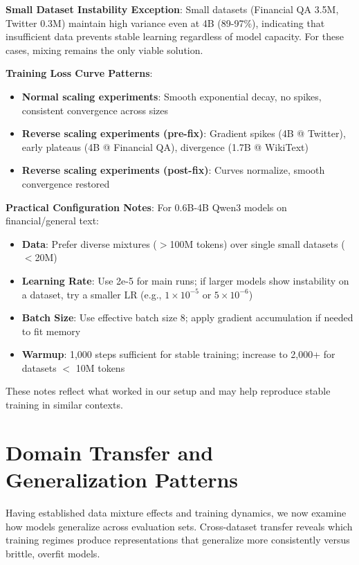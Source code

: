 \textbf{Small Dataset Instability Exception}: Small datasets (Financial QA 3.5M, Twitter 0.3M) maintain high variance even at 4B (89-97\%), indicating that insufficient data prevents stable learning regardless of model capacity. For these cases, mixing remains the only viable solution.

\textbf{Training Loss Curve Patterns}:
\begin{itemize}
\item \textbf{Normal scaling experiments}: Smooth exponential decay, no spikes, consistent convergence across sizes
\item \textbf{Reverse scaling experiments (pre-fix)}: Gradient spikes (4B @ Twitter), early plateaus (4B @ Financial QA), divergence (1.7B @ WikiText)
\item \textbf{Reverse scaling experiments (post-fix)}: Curves normalize, smooth convergence restored
\end{itemize}

\textbf{Practical Configuration Notes}: For 0.6B-4B Qwen3 models on financial/general text:
\begin{itemize}
\item \textbf{Data}: Prefer diverse mixtures ($>$100M tokens) over single small datasets ($<$20M)
\item \textbf{Learning Rate}: Use 2e-5 for main runs; if larger models show instability on a dataset, try a smaller LR (e.g., $1\times10^{-5}$ or $5\times10^{-6}$)
\item \textbf{Batch Size}: Use effective batch size 8; apply gradient accumulation if needed to fit memory
\item \textbf{Warmup}: 1,000 steps sufficient for stable training; increase to 2,000+ for datasets $<$ 10M tokens
\end{itemize}

These notes reflect what worked in our setup and may help reproduce stable training in similar contexts.

\section{Domain Transfer and Generalization Patterns}

Having established data mixture effects and training dynamics, we now examine how models generalize across evaluation sets. Cross-dataset transfer reveals which training regimes produce representations that generalize more consistently versus brittle, overfit models.

